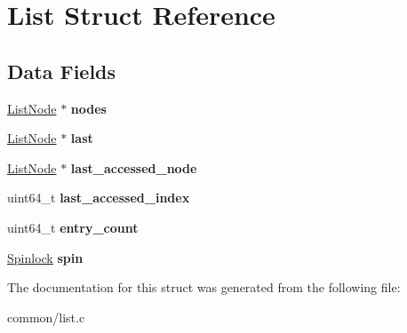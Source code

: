 \hypertarget{structList}{}\section{List Struct Reference}
\label{structList}
\subsection*{Data Fields}
\begin{DoxyCompactItemize}
\item 
\hyperlink{structListNode}{List\+Node} $\ast$ {\bfseries nodes}\hypertarget{structList_a9c5dcaa25e21ff0fccb6d3523859493e}{}\label{structList_a9c5dcaa25e21ff0fccb6d3523859493e}

\item 
\hyperlink{structListNode}{List\+Node} $\ast$ {\bfseries last}\hypertarget{structList_ab10b317c70fdf0bddfe07c062859cec4}{}\label{structList_ab10b317c70fdf0bddfe07c062859cec4}

\item 
\hyperlink{structListNode}{List\+Node} $\ast$ {\bfseries last\+\_\+accessed\+\_\+node}\hypertarget{structList_a9aa68928356c18cc8e6eda0b9157629a}{}\label{structList_a9aa68928356c18cc8e6eda0b9157629a}

\item 
uint64\+\_\+t {\bfseries last\+\_\+accessed\+\_\+index}\hypertarget{structList_aa1e56010c8537f5ffc34434a7ab17e22}{}\label{structList_aa1e56010c8537f5ffc34434a7ab17e22}

\item 
uint64\+\_\+t {\bfseries entry\+\_\+count}\hypertarget{structList_a944e6cb062708821eceb5af721ce644c}{}\label{structList_a944e6cb062708821eceb5af721ce644c}

\item 
\hyperlink{group__sync__hal_ga2b7bd1f01b65ccbfaee98f004746ae8b}{Spinlock} {\bfseries spin}\hypertarget{structList_a58ca01fa09f9c2ad1c53946923b9643d}{}\label{structList_a58ca01fa09f9c2ad1c53946923b9643d}

\end{DoxyCompactItemize}


The documentation for this struct was generated from the following file\+:\begin{DoxyCompactItemize}
\item 
common/list.\+c\end{DoxyCompactItemize}
